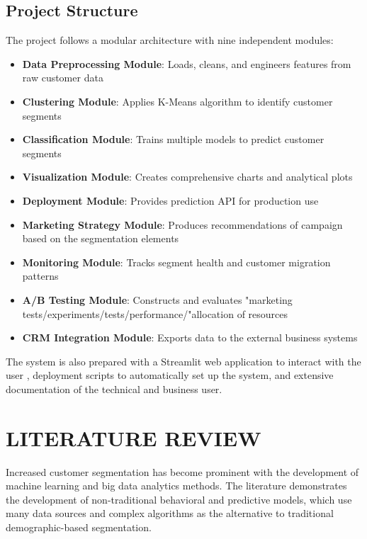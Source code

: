 \documentclass[12pt,a4paper]{report}
\begin{document}
\section{Project Structure}
The project follows a modular architecture with nine independent modules:

\begin{itemize}
    \item \textbf{Data Preprocessing Module}: Loads, cleans, and engineers features from raw customer data \cite{blattberg2008}
    \item \textbf{Clustering Module}: Applies K-Means algorithm to identify customer segments \cite{macqueen1967}
    \item \textbf{Classification Module}: Trains multiple models to predict customer segments \cite{hastie2009}
    \item \textbf{Visualization Module}: Creates comprehensive charts and analytical plots \cite{rousseeuw1987}
    \item \textbf{Deployment Module}: Provides prediction API for production use \cite{streamlit2019}
    \item \textbf{Marketing Strategy Module}: Produces recommendations of campaign based on the segmentation elements \cite{kotler2016}
    \item \textbf{Monitoring Module}: Tracks segment health and customer migration patterns \cite{neslin2006}
    \item \textbf{A/B Testing Module}: Constructs and evaluates "marketing tests/experiments/tests/performance/"allocation of resources \cite{kohavi2009}
    \item \textbf{CRM Integration Module}: Exports data to the external business systems \cite{payne2005}
\end{itemize}

\noindent
The system is also prepared with a Streamlit web application to interact with the user \cite{streamlit2019}, deployment scripts to automatically set up the system\cite{merkel2014}, and extensive documentation of the technical and business user.

\chapter{LITERATURE REVIEW}

\noindent
Increased customer segmentation has become prominent with the development of machine learning and big data analytics methods. The literature demonstrates the development of non-traditional behavioral and predictive models, which use many data sources and complex algorithms as the alternative to traditional demographic-based segmentation.
\end{document}
